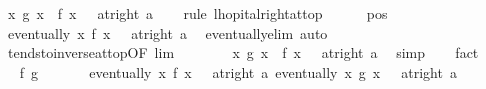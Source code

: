 \begin{isabellebody}
\ {\isachardoublequoteopen}{\isacharparenleft}{\kern0pt}{\isacharparenleft}{\kern0pt}{\isasymlambda}x{\isachardot}{\kern0pt}\ g\ x\ {\isacharslash}{\kern0pt}\ f\ x{\isacharparenright}{\kern0pt}\ {\isasymlonglongrightarrow}\ {}{\isacharparenright}{\kern0pt}\ {\isacharparenleft}{\kern0pt}at{\isacharunderscore}{\kern0pt}right\ a{\isacharparenright}{\kern0pt}{\isachardoublequoteclose}\isanewline
\ \ \isamarkupfalse%
\ {\isacharparenleft}{\kern0pt}rule\ lhopital{\isacharunderscore}{\kern0pt}right{\isacharunderscore}{\kern0pt}at{\isacharunderscore}{\kern0pt}top{\isacharparenright}{\kern0pt}\isanewline
\ \ \ \ \isamarkupfalse%
\ pos\ \isamarkupfalse%
\ {\isachardoublequoteopen}eventually\ {\isacharparenleft}{\kern0pt}{\isasymlambda}x{\isachardot}{\kern0pt}\ f{\isacharprime}{\kern0pt}\ x\ {\isasymnoteq}\ {}{\isacharparenright}{\kern0pt}\ {\isacharparenleft}{\kern0pt}at{\isacharunderscore}{\kern0pt}right\ a{\isacharparenright}{\kern0pt}{\isachardoublequoteclose}\ \isamarkupfalse%
\ eventually{\isacharunderscore}{\kern0pt}elim\ auto\isanewline
\ \ \ \ \isamarkupfalse%
\ tendsto{\isacharunderscore}{\kern0pt}inverse{\isacharunderscore}{\kern0pt}{}{\isacharunderscore}{\kern0pt}at{\isacharunderscore}{\kern0pt}top{\isacharbrackleft}{\kern0pt}OF\ lim{\isacharbrackright}{\kern0pt}\isanewline
\ \ \ \ \ \ \isamarkupfalse%
\ {\isachardoublequoteopen}{\isacharparenleft}{\kern0pt}{\isacharparenleft}{\kern0pt}{\isasymlambda}x{\isachardot}{\kern0pt}\ g{\isacharprime}{\kern0pt}\ x\ {\isacharslash}{\kern0pt}\ f{\isacharprime}{\kern0pt}\ x{\isacharparenright}{\kern0pt}\ {\isasymlonglongrightarrow}\ {}{\isacharparenright}{\kern0pt}\ {\isacharparenleft}{\kern0pt}at{\isacharunderscore}{\kern0pt}right\ a{\isacharparenright}{\kern0pt}{\isachardoublequoteclose}\ \isamarkupfalse%
\ simp\isanewline
\ \ \isamarkupfalse%
\ fact{\isacharplus}{\kern0pt}\isanewline
\ \ \isamarkupfalse%
\ \isamarkupfalse%
\ f{\isacharunderscore}{\kern0pt}{}\ g{\isacharunderscore}{\kern0pt}{}\ \isanewline
\ \ \ \ \isamarkupfalse%
\ {\isachardoublequoteopen}eventually\ {\isacharparenleft}{\kern0pt}{\isasymlambda}x{\isachardot}{\kern0pt}\ f\ x\ {\isachargreater}{\kern0pt}\ {}{\isacharparenright}{\kern0pt}\ {\isacharparenleft}{\kern0pt}at{\isacharunderscore}{\kern0pt}right\ a{\isacharparenright}{\kern0pt}{\isachardoublequoteclose}\ {\isachardoublequoteopen}eventually\ {\isacharparenleft}{\kern0pt}{\isasymlambda}x{\isachardot}{\kern0pt}\ g\ x\ {\isachargreater}{\kern0pt}\ {}{\isacharparenright}{\kern0pt}\ {\isacharparenleft}{\kern0pt}at{\isacharunderscore}{\kern0pt}right\ a{\isacharparenright}{\kern0pt}{\isachardoublequoteclose}\isanewline

\end{isabellebody}
